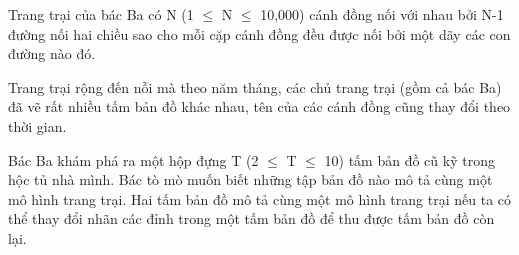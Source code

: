 Trang trại của bác Ba có N (1  $\le$  N  $\le$  10,000) cánh đồng nối với nhau bởi N-1 đường nối hai chiều sao cho mỗi cặp cánh đồng đều được nối bởi một dãy các con đường nào đó.  

   Trang trại rộng đến nỗi mà theo năm tháng, các chủ trang trại (gồm cả bác Ba) đã vẽ rất nhiều tấm bản đồ khác nhau, tên của các cánh đồng cũng thay đổi theo thời gian.  

   Bác Ba khám phá ra một hộp đựng T (2  $\le$  T  $\le$  10) tấm bản đồ cũ kỹ trong hộc tủ nhà mình. Bác tò mò muốn biết những tập bản đồ nào mô tả cùng một mô hình trang trại. Hai tấm bản đồ mô tả cùng một mô hình trang trại nếu ta có thể thay đổi nhãn các đỉnh trong một tấm bản đồ để thu được tấm bản đồ còn lại.